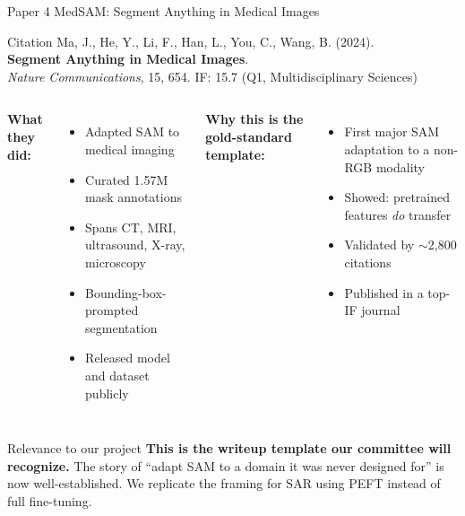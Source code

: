 \documentclass[10pt,aspectratio=169]{beamer}
\begin{document}
\begin{frame}{Paper 4 \quad MedSAM: Segment Anything in Medical Images}
\begin{block}{Citation}
Ma, J., He, Y., Li, F., Han, L., You, C., Wang, B. (2024). \\
\textbf{Segment Anything in Medical Images}. \\
\textit{Nature Communications}, 15, 654. \quad \textcolor{primaryblue}{IF: 15.7 (Q1, Multidisciplinary Sciences)}
\end{block}

\begin{columns}[T,onlytextwidth]
\textbf{What they did:}
\begin{itemize}
\item Adapted SAM to medical imaging
\item Curated 1.57M mask annotations
\item Spans CT, MRI, ultrasound, X-ray, microscopy
\item Bounding-box-prompted segmentation
\item Released model and dataset publicly
\end{itemize}

\textbf{Why this is the gold-standard template:}
\begin{itemize}
\item First major SAM adaptation to a non-RGB modality
\item Showed: pretrained features \textit{do} transfer
\item Validated by $\sim$2{,}800 citations
\item Published in a top-IF journal
\end{itemize}
\end{columns}

\vspace{0.5em}
\begin{alertblock}{Relevance to our project}
\textbf{This is the writeup template our committee will recognize.} The story of ``adapt SAM to a domain it was never designed for'' is now well-established. We replicate the framing for SAR using PEFT instead of full fine-tuning.
\end{alertblock}
\end{frame}
\end{document}
